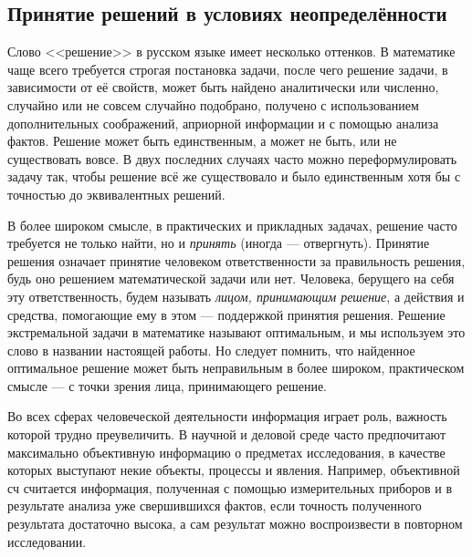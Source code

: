 
\subsection{Принятие решений в условиях неопределённости}
\label{sec:basic_intro}

Слово <<решение>> в русском языке имеет несколько оттенков. В математике чаще всего требуется строгая постановка задачи, после чего решение задачи, в зависимости от её свойств, может быть найдено аналитически или численно, случайно или не совсем случайно подобрано, получено с использованием дополнительных соображений,  априорной информации и с помощью анализа фактов. Решение может быть единственным, а может не быть, или не существовать вовсе. В двух последних случаях часто можно переформулировать задачу так, чтобы решение всё же существовало и было единственным хотя бы с точностью до эквивалентных решений. 

В более широком смысле, в практических и прикладных задачах, решение часто требуется не только найти, но и {\sl принять} (иногда --- отвергнуть). Принятие решения означает принятие человеком ответственности за правильность решения, будь оно решением математической задачи или нет. Человека, берущего на себя эту ответственность, будем называть {\sl лицом, принимающим решение}, а действия и средства, помогающие ему в этом ---  поддержкой принятия решения. Решение экстремальной задачи в математике называют оптимальным, и мы используем это слово в названии настоящей работы. Но следует помнить, что найденное оптимальное решение может быть неправильным в более широком, практическом смысле --- с точки зрения лица, принимающего решение. 

Во всех сферах человеческой деятельности информация играет роль, важность которой трудно преувеличить. В научной и деловой среде часто предпочитают максимально объективную информацию о предметах исследования, в качестве которых выступают некие объекты, процессы и явления. Например, объективной сч считается информация, полученная с помощью измерительных приборов и в результате анализа уже свершившихся фактов, если точность полученного результата достаточно высока, а сам результат можно воспроизвести в повторном исследовании. 

